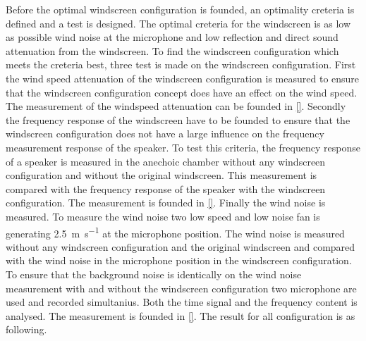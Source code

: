 

Before the optimal windscreen configuration is founded, an optimality creteria is defined and a test is designed. The optimal creteria for the windscreen is as low as possible wind noise at the microphone and low reflection and direct sound attenuation from the windscreen. To find the windscreen configuration which meets the creteria best, three test is made on the windscreen configuration. First the wind speed attenuation of the windscreen configuration is measured to ensure that the windscreen configuration concept does have an effect on the wind speed. The measurement of the windspeed attenuation can be founded in \autoref{}. Secondly the frequency response of the windscreen have to be founded to ensure that the windscreen configuration does not have a large influence on the frequency measurement response of the speaker. To test this criteria, the frequency response of a speaker is measured in the anechoic chamber without any windscreen configuration and without the original windscreen. This measurement is compared with the frequency response of the speaker with the windscreen configuration. The measurement is founded in \autoref{}. Finally the wind noise is measured. To measure the wind noise two low speed and low noise fan is generating \SI{2.5}{\meter\per\second} at the microphone position. The wind noise is measured without any windscreen configuration and the original windscreen and compared with the wind noise in the microphone position in the windscreen configuration. To ensure that the background noise is identically on the wind noise measurement with and without the windscreen configuration two microphone are used and recorded simultanius. Both the time signal and the frequency content is analysed. The measurement is founded in \autoref{}. The result for all configuration is as following.

